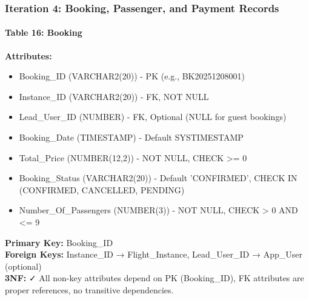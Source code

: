 \documentclass[12pt,a4paper,openany]{report}
\begin{document}
\subsubsection{Iteration 4: Booking, Passenger, and Payment Records}

\paragraph{Table 16: Booking}
\textbf{Attributes:} 
\begin{itemize}
    \item Booking\_ID (VARCHAR2(20)) - PK (e.g., BK20251208001)
    \item Instance\_ID (VARCHAR2(20)) - FK, NOT NULL
    \item Lead\_User\_ID (NUMBER) - FK, Optional (NULL for guest bookings)
    \item Booking\_Date (TIMESTAMP) - Default SYSTIMESTAMP
    \item Total\_Price (NUMBER(12,2)) - NOT NULL, CHECK >= 0
    \item Booking\_Status (VARCHAR2(20)) - Default 'CONFIRMED', CHECK IN (CONFIRMED, CANCELLED, PENDING)
    \item Number\_Of\_Passengers (NUMBER(3)) - NOT NULL, CHECK > 0 AND <= 9
\end{itemize}
\textbf{Primary Key:} Booking\_ID\\
\textbf{Foreign Keys:} Instance\_ID → Flight\_Instance, Lead\_User\_ID → App\_User (optional)\\
\textbf{3NF:} ✓ All non-key attributes depend on PK (Booking\_ID), FK attributes are proper references, no transitive dependencies.
\end{document}

